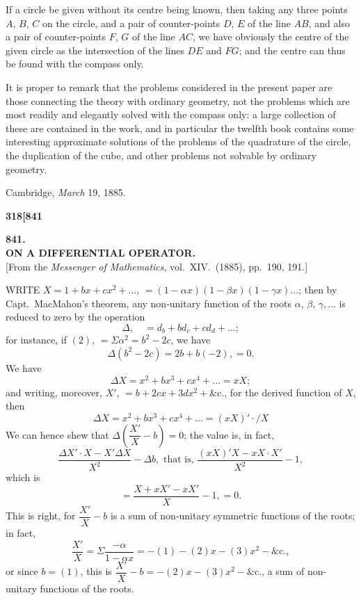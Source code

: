 \documentclass[12pt,a4paper]{article}
\theoremstyle{definition}
\begin{document}
If a circle be given without its centre being known, then taking any three points $A$, $B$, $C$ on the circle, and a pair of counter-points $D$, $E$ of the line $AB$, and also a pair of counter-points $F$, $G$ of the line $AC$, we have obviously the centre of the given circle as the intersection of the lines $DE$ and $FG$; and the centre can thus be found with the compass only.

It is proper to remark that the problems considered in the present paper are those connecting the theory with ordinary geometry, not the problems which are most readily and elegantly solved with the compass only: a large collection of these are contained in the work, and in particular the twelfth book contains some interesting approximate solutions of the problems of the quadrature of the circle, the duplication of the cube, and other problems not solvable by ordinary geometry.

\smallskip
\hfill Cambridge, \textit{March} 19, 1885.

\vspace{2em}


\newpage
\setcounter{page}{318}

\noindent\textbf{318}\hfill\textbf{[841}

\bigskip

\begin{center}
{\Large\textbf{841.}}\\[1em]
{\large\textbf{ON A DIFFERENTIAL OPERATOR.}}\\[1em]
[From the \textit{Messenger of Mathematics}, vol.\ XIV.\ (1885), pp.\ 190, 191.]
\end{center}

\bigskip

\noindent WRITE $X = 1 + bx + cx^2 + \ldots$, $= (1 - \alpha x)(1 - \beta x)(1 - \gamma x) \ldots$; then by Capt.\ MacMahon's theorem, any non-unitary function of the roots $\alpha$, $\beta$, $\gamma, \ldots$ is reduced to zero by the operation
\[
\Delta, \quad = d_b + b d_c + c d_d + \ldots;
\]
for instance, if $(2)$, $= \Sigma \alpha^2 = b^2 - 2c$, we have
\[
\Delta(b^2 - 2c) = 2b + b(-2), = 0.
\]
We have
\[
\Delta X = x^2 + bx^3 + cx^4 + \ldots = xX;
\]
and writing, moreover, $X'$, $= b + 2cx + 3dx^2 + \&\text{c.}$, for the derived function of $X$, then
\[
\Delta X = x^2 + bx^3 + cx^4 + \ldots = (xX)' \cdot /X
\]
We can hence shew that $\Delta\left(\dfrac{X'}{X} - b\right) = 0$; the value is, in fact,
\[
\frac{\Delta X' \cdot X - X'\Delta X}{X^2} - \Delta b, \text{ that is, } \frac{(xX)'X - xX \cdot X'}{X^2} - 1,
\]
which is
\[
= \frac{X + xX' - xX'}{X} - 1, = 0.
\]
This is right, for $\dfrac{X'}{X} - b$ is a sum of non-unitary symmetric functions of the roots; in fact,
\[
\frac{X'}{X} = \Sigma \frac{-\alpha}{1 - \alpha x} = -(1) - (2)x - (3)x^2 - \&\text{c.},
\]
or since $b = (1)$, this is $\dfrac{X'}{X} - b = -(2)x - (3)x^2 - \&\text{c.}$, a sum of non-unitary functions of the roots.
\end{document}
